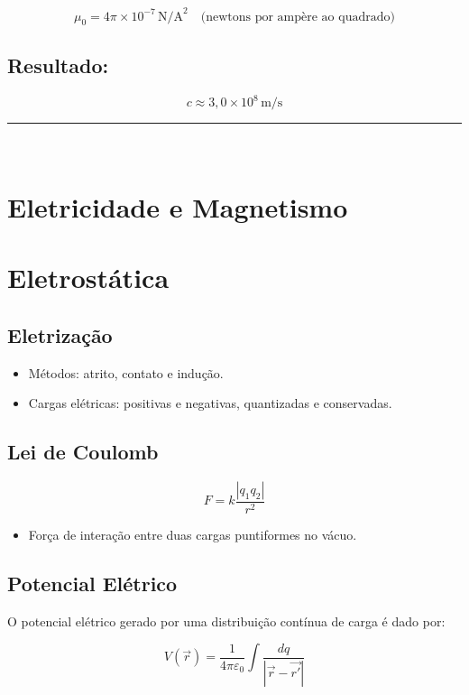 \documentclass[a4paper,12pt]{article}
\begin{document}
\begin{multicols}{2}
\[
\mu_0 = 4\pi \times 10^{-7} \, \text{N/A}^2
\quad \text{(newtons por ampère ao quadrado)}
\]

\subsection*{Resultado:}

\[
c \approx 3{,}0 \times 10^8 \, \text{m/s}
\]


\noindent\rule{\linewidth}{1pt}\\

\section{Eletricidade e Magnetismo}

\section{Eletrostática}

\subsection{Eletrização}
\begin{itemize}
    \item Métodos: atrito, contato e indução.
    \item Cargas elétricas: positivas e negativas, quantizadas e conservadas.
\end{itemize}

\subsection{Lei de Coulomb}
\begin{equation*}
    F = k \frac{|q_1 q_2|}{r^2}
\end{equation*}
\begin{itemize}
    \item Força de interação entre duas cargas puntiformes no vácuo.
\end{itemize}

\subsection{Potencial Elétrico}
O potencial elétrico gerado por uma distribuição contínua de carga é dado por:

\begin{equation*}
V(\vec{r}) = \frac{1}{4\pi \varepsilon_0} \int \frac{dq}{|\vec{r} - \vec{r'}|}
\end{equation*}


\end{multicols}
\end{document}

